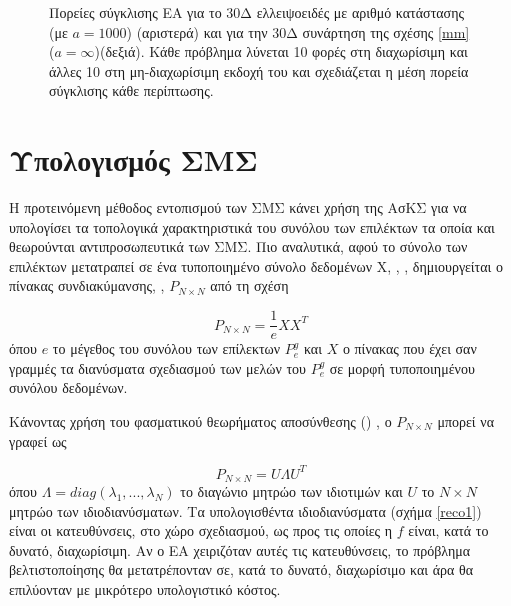 \begin{figure}[h!]
\begin{minipage}[b]{0.5\linewidth}
\end{minipage}
\caption{Πορείες σύγκλισης ΕΑ για το 30Δ ελλειψοειδές με αριθμό κατάστασης (με $a=1000$) (αριστερά) και για την 30Δ συνάρτηση της σχέσης \ref{mm} ($a=\infty$)(δεξιά). Κάθε πρόβλημα λύνεται 10 φορές στη διαχωρίσιμη και άλλες 10 στη μη-διαχωρίσιμη εκδοχή του και σχεδιάζεται η μέση πορεία σύγκλισης κάθε περίπτωσης.} 
\label{ellipse_t2}
\end{figure}



\section{Υπολογισμός ΣΜΣ}
Η προτεινόμενη μέθοδος εντοπισμού των ΣΜΣ κάνει χρήση της ΑσΚΣ για να υπολογίσει τα τοπολογικά χαρακτηριστικά του συνόλου των επιλέκτων τα οποία και θεωρούνται αντιπροσωπευτικά των ΣΜΣ. Πιο αναλυτικά, αφού το σύνολο των επιλέκτων μετατραπεί σε ένα τυποποιημένο σύνολο δεδομένων Χ, , \cite{Axler_1997}, δημιουργείται ο πίνακας συνδιακύμανσης, ,  $P_{N\times N}$ από τη σχέση 

\begin{equation} 
   P_{N\times N}= \frac{1}{e}XX^T
   \label{Cov_Mat} 
\end{equation}
όπου $e$ το μέγεθος του συνόλου των επίλεκτων $P_e^g$ και $X$ ο πίνακας που έχει σαν γραμμές τα διανύσματα σχεδιασμού των μελών του $P_e^g$ σε μορφή τυποποιημένου συνόλου δεδομένων.

Κάνοντας χρήση του φασματικού θεωρήματος αποσύνθεσης ()
 \cite{Axler_1997, Fodor_2002}, ο $P_{N\times N}$ μπορεί να γραφεί ως

\begin{equation} 
   P_{N\times N}= U\Lambda U^T
   \label{spectral}
\end{equation}
όπου $\Lambda\!=\!diag(\lambda_1 , . . . , \lambda_N )$ το διαγώνιο μητρώο των ιδιοτιμών και $U$ το $N\!\times\!N$ μητρώο των ιδιοδιανύσματων. 
Τα υπολογισθέντα ιδιοδιανύσματα (σχήμα \ref{reco1}) είναι οι κατευθύνσεις, στο χώρο σχεδιασμού, ως προς τις οποίες η $f$ είναι, κατά το δυνατό, διαχωρίσιμη. Αν ο ΕΑ χειριζόταν αυτές τις κατευθύνσεις, το πρόβλημα βελτιστοποίησης θα μετατρέπονταν σε, κατά το δυνατό, διαχωρίσιμο και άρα θα επιλύονταν με μικρότερο υπολογιστικό κόστος.    

